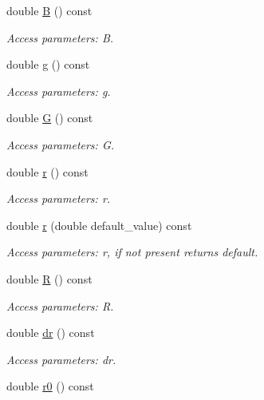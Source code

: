 \begin{DoxyCompactItemize}
double \hyperlink{struct_d_d4hep_1_1_x_m_l_1_1_child_value_aac32a15204468c6e0b2167573da2f4e1}{B} () const
\begin{DoxyCompactList}\small\item\em Access parameters\+: B. \end{DoxyCompactList}\item 
double \hyperlink{struct_d_d4hep_1_1_x_m_l_1_1_child_value_a98ff4604caa12860cbb999ec6d1e1106}{g} () const
\begin{DoxyCompactList}\small\item\em Access parameters\+: g. \end{DoxyCompactList}\item 
double \hyperlink{struct_d_d4hep_1_1_x_m_l_1_1_child_value_ab7e59af1efa7a4a8fe98e241e19a223c}{G} () const
\begin{DoxyCompactList}\small\item\em Access parameters\+: G. \end{DoxyCompactList}\item 
double \hyperlink{struct_d_d4hep_1_1_x_m_l_1_1_child_value_a8a21955cffd06ea588042536eeafafdb}{r} () const
\begin{DoxyCompactList}\small\item\em Access parameters\+: r. \end{DoxyCompactList}\item 
double \hyperlink{struct_d_d4hep_1_1_x_m_l_1_1_child_value_a043cecf0132f1be7316f5355829ab9f9}{r} (double default\+\_\+value) const
\begin{DoxyCompactList}\small\item\em Access parameters\+: r, if not present returns default. \end{DoxyCompactList}\item 
double \hyperlink{struct_d_d4hep_1_1_x_m_l_1_1_child_value_afcdfbd67a48dd6d9bdcd39da24d14eb9}{R} () const
\begin{DoxyCompactList}\small\item\em Access parameters\+: R. \end{DoxyCompactList}\item 
double \hyperlink{struct_d_d4hep_1_1_x_m_l_1_1_child_value_a8dc35d75e9080d6940ddd6de18549db8}{dr} () const
\begin{DoxyCompactList}\small\item\em Access parameters\+: dr. \end{DoxyCompactList}\item 
double \hyperlink{struct_d_d4hep_1_1_x_m_l_1_1_child_value_aacb961da9e78c96be5621540abc43c87}{r0} () const

\end{DoxyCompactItemize}
